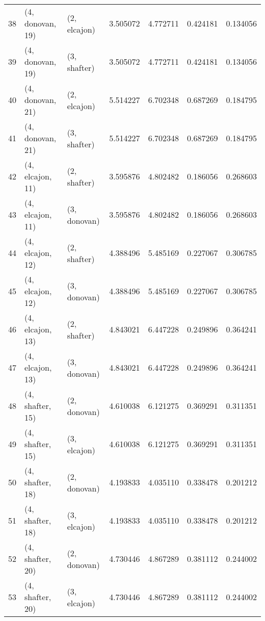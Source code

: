 \begin{tabular}{lllrrrr}
38 &  (4, donovan, 19) &     (2, elcajon) &  3.505072 &  4.772711 &   0.424181 &  0.134056 \\
39 &  (4, donovan, 19) &     (3, shafter) &  3.505072 &  4.772711 &   0.424181 &  0.134056 \\
40 &  (4, donovan, 21) &     (2, elcajon) &  5.514227 &  6.702348 &   0.687269 &  0.184795 \\
41 &  (4, donovan, 21) &     (3, shafter) &  5.514227 &  6.702348 &   0.687269 &  0.184795 \\
42 &  (4, elcajon, 11) &     (2, shafter) &  3.595876 &  4.802482 &   0.186056 &  0.268603 \\
43 &  (4, elcajon, 11) &     (3, donovan) &  3.595876 &  4.802482 &   0.186056 &  0.268603 \\
44 &  (4, elcajon, 12) &     (2, shafter) &  4.388496 &  5.485169 &   0.227067 &  0.306785 \\
45 &  (4, elcajon, 12) &     (3, donovan) &  4.388496 &  5.485169 &   0.227067 &  0.306785 \\
46 &  (4, elcajon, 13) &     (2, shafter) &  4.843021 &  6.447228 &   0.249896 &  0.364241 \\
47 &  (4, elcajon, 13) &     (3, donovan) &  4.843021 &  6.447228 &   0.249896 &  0.364241 \\
48 &  (4, shafter, 15) &     (2, donovan) &  4.610038 &  6.121275 &   0.369291 &  0.311351 \\
49 &  (4, shafter, 15) &     (3, elcajon) &  4.610038 &  6.121275 &   0.369291 &  0.311351 \\
50 &  (4, shafter, 18) &     (2, donovan) &  4.193833 &  4.035110 &   0.338478 &  0.201212 \\
51 &  (4, shafter, 18) &     (3, elcajon) &  4.193833 &  4.035110 &   0.338478 &  0.201212 \\
52 &  (4, shafter, 20) &     (2, donovan) &  4.730446 &  4.867289 &   0.381112 &  0.244002 \\
53 &  (4, shafter, 20) &     (3, elcajon) &  4.730446 &  4.867289 &   0.381112 &  0.244002 \\
\bottomrule
\end{tabular}
